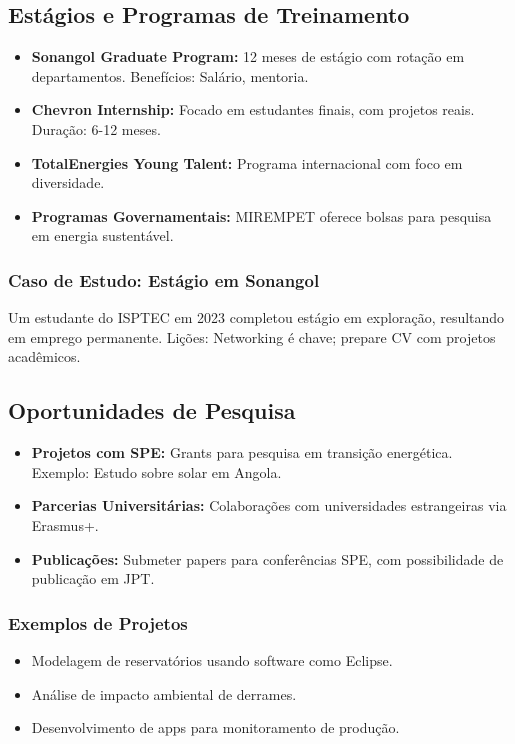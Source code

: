 \documentclass[12pt]{article}
\begin{document}
\subsection{Estágios e Programas de Treinamento}
\begin{itemize}
    \item \textbf{Sonangol Graduate Program:} 12 meses de estágio com rotação em departamentos. Benefícios: Salário, mentoria.
    \item \textbf{Chevron Internship:} Focado em estudantes finais, com projetos reais. Duração: 6-12 meses.
    \item \textbf{TotalEnergies Young Talent:} Programa internacional com foco em diversidade.
    \item \textbf{Programas Governamentais:} MIREMPET oferece bolsas para pesquisa em energia sustentável.
\end{itemize}

\subsubsection{Caso de Estudo: Estágio em Sonangol}
Um estudante do ISPTEC em 2023 completou estágio em exploração, resultando em emprego permanente. Lições: Networking é chave; prepare CV com projetos acadêmicos.

\subsection{Oportunidades de Pesquisa}
\begin{itemize}
    \item \textbf{Projetos com SPE:} Grants para pesquisa em transição energética. Exemplo: Estudo sobre solar em Angola.
    \item \textbf{Parcerias Universitárias:} Colaborações com universidades estrangeiras via Erasmus+.
    \item \textbf{Publicações:} Submeter papers para conferências SPE, com possibilidade de publicação em JPT.
\end{itemize}

\subsubsection{Exemplos de Projetos}
\begin{itemize}
    \item Modelagem de reservatórios usando software como Eclipse.
    \item Análise de impacto ambiental de derrames.
    \item Desenvolvimento de apps para monitoramento de produção.
\end{itemize}
\end{document}
